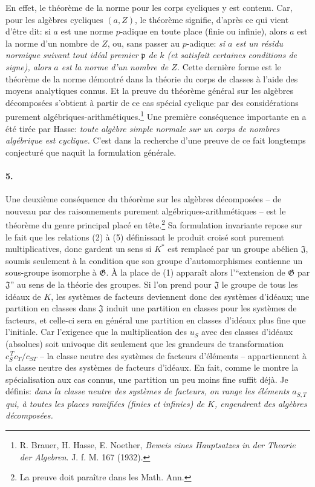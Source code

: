 En effet, le théorème de la norme pour les corps cycliques y est contenu. Car, pour les algèbres cycliques \((a,Z)\), le théorème signifie, d'après ce qui vient d'être dit: si \(a\) est une norme \(p\)-adique en toute place (finie ou infinie), alors \(a\) est la norme d'un nombre de \(Z\), ou, sans passer au \(p\)-adique: \emph{si \(a\) est un résidu normique suivant tout idéal premier \(\mathfrak p\) de \(k\) (et satisfait certaines conditions de signe), alors \(a\) est la norme d'un nombre de \(Z\).} Cette dernière forme est le théorème de la norme démontré dans la théorie du corps de classes à l'aide des moyens analytiques connus. Et la preuve du théorème général sur les algèbres décomposées s'obtient à partir de ce cas spécial cyclique par des considérations purement algébriques-arithmétiques.\footnote{R. Brauer, H. Hasse, E. Noether, \emph{Beweis eines Hauptsatzes in der Theorie der Algebren}. J. f. M. 167 (1932).} Une première conséquence importante en a été tirée par Hasse: \emph{toute algèbre simple normale sur un corps de nombres algébrique est cyclique.} C'est dans la recherche d'une preuve de ce fait longtemps conjecturé que naquit la formulation générale.

\paragraph{5.}
Une deuxième conséquence du théorème sur les algèbres décomposées -- de nouveau par des raisonnements purement algébriques-arithmétiques -- est le théorème du genre principal placé en tête.\footnote{La preuve doit paraître dans les Math. Ann.} Sa formulation invariante repose sur le fait que les relations (2) à (5) définissant le produit croisé sont purement multiplicatives, donc gardent un sens si \(K^\ast\) est remplacé par un groupe abélien \(\mathfrak{J}\), soumis seulement à la condition que son groupe d'automorphismes contienne un sous-groupe isomorphe à \(\mathfrak{G}\). À la place de (1) apparaît alors l'``extension de \(\mathfrak{G}\) par \(\mathfrak{J}\)'' au sens de la théorie des groupes. Si l'on prend pour \(\mathfrak{J}\) le groupe de tous les idéaux de \(K\), les systèmes de facteurs deviennent donc des systèmes d'idéaux; une partition en classes dans \(\mathfrak{J}\) induit une partition en classes pour les systèmes de facteurs, et celle-ci sera en général une partition en classes d'idéaux plus fine que l'initiale. Car l'exigence que la multiplication des \(u_S\) avec des classes d'idéaux (absolues) soit univoque dit seulement que les grandeurs de transformation \(c_S^{\,T}c_T/c_{ST}\) -- la classe neutre des systèmes de facteurs d'éléments -- appartiennent à la classe neutre des systèmes de facteurs d'idéaux. En fait, comme le montre la spécialisation aux cas connus, une partition un peu moins fine suffit déjà. Je définis: \emph{dans la classe neutre des systèmes de facteurs, on range les éléments \(a_{S,T}\) qui, à toutes les places ramifiées (finies et infinies) de \(K\), engendrent des algèbres décomposées.}

